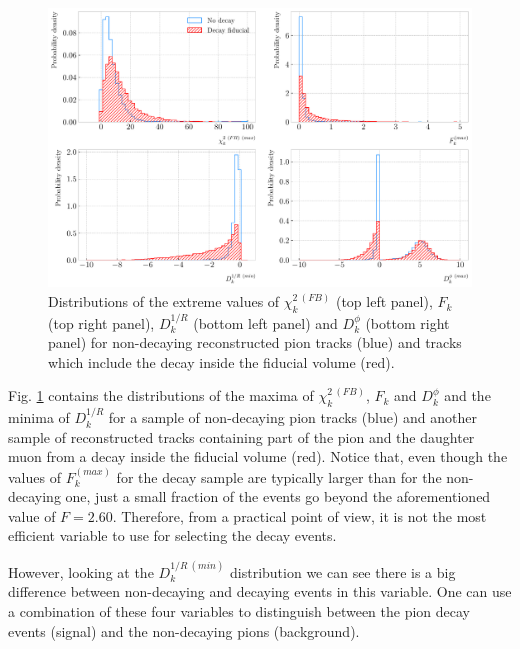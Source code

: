 \begin{figure}[t]
	\centering
	\includegraphics[width=.85\linewidth]{Images/GArSoft_PID/pion_decay/pion_decay_variables.pdf}
	\caption{Distributions of the extreme values of $\chi^{2 \ (FB)}_{k}$ (top left panel), $F_{k}$ (top right panel), $D^{1/R}_{k}$ (bottom left panel) and $D^{\phi}_{k}$ (bottom right panel) for non-decaying reconstructed pion tracks (blue) and tracks which include the decay inside the fiducial volume (red).}
	\label{fig:breakpoint_variables}
\end{figure}

Fig. \ref{fig:breakpoint_variables} contains the distributions of the maxima of $\chi^{2 \ (FB)}_{k}$, $F_{k}$ and $D^{\phi}_{k}$ and the minima of $D^{1/R}_{k}$ for a sample of non-decaying pion tracks (blue) and another sample of reconstructed tracks containing part of the pion and the daughter muon from a decay inside the fiducial volume (red). Notice that, even though the values of $F^{(max)}_{k}$ for the decay sample are typically larger than for the non-decaying one, just a small fraction of the events go beyond the aforementioned value of $F=2.60$. Therefore, from a practical point of view, it is not the most efficient variable to use for selecting the decay events.

However, looking at the $D^{1/R \ (min)}_{k}$ distribution we can see there is a big difference between non-decaying and decaying events in this variable. One can use a combination of these four variables to distinguish between the pion decay events (signal) and the non-decaying pions (background).

